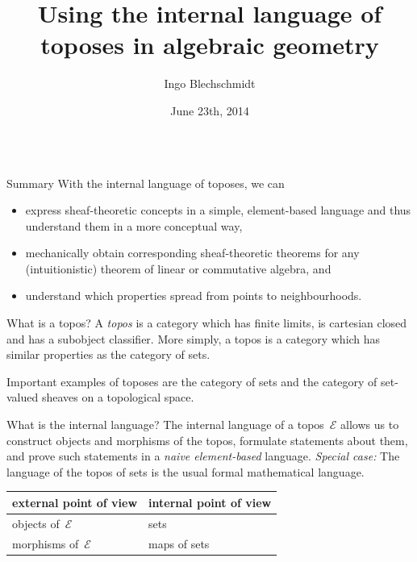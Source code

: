 \documentclass[table]{beamer}
\title{Using the internal language of toposes in algebraic geometry}
\author{Ingo Blechschmidt}
\institute{University of Augsburg}
\date{June 23th, 2014}
\newcommand{\E}{\mathcal{E}}
\begin{document}
\begin{frame}[t]\begin{columns}[t]

\begin{column}{0.3\textwidth}
  \begin{alertblock}{Summary}
    With the internal language of toposes, we can
    \begin{itemize}\justifying
    \item express sheaf-theoretic
    concepts in a simple, ele\-ment-ba\-sed language and thus understand them
    in a more conceptual way,
    \item mechanically obtain
    corresponding sheaf-theo\-re\-tic theorems for any (intuitionistic) theorem of
    linear or commutative algebra, and
    \item understand which properties spread from
    points to neighbourhoods.
    \end{itemize}
  \end{alertblock}
  \bigskip

  \begin{block}{What is a topos?}
    A \emph{topos} is a category which has finite limits, is cartesian closed and
    has a subobject classifier. More simply, a topos is a category which has
    similar properties as the category of sets.\medskip

    Important examples of toposes are
    the category of sets and
    the category of set-valued sheaves on a topological space.
  \end{block}
  \bigskip

  \begin{block}{What is the internal language?}
    The internal language of a topos~$\E$ allows us to
    construct objects and morphisms of the topos,
    formulate statements about them, and
    prove such statements
    in a \emph{naive element-based} language.
    \emph{Special case:} The language of the topos of sets is the usual
    formal mathematical language.

    \begin{center}
      \begin{tabular}{ll}
        \toprule
        external point of view & internal point of view \\
        \midrule
        objects of~$\E$ & sets \\
        morphisms of~$\E$ & maps of sets \\
        \bottomrule
      \end{tabular}
    \end{center}
  \end{block}


\end{column}
\end{columns}
\end{frame}
\end{document}

